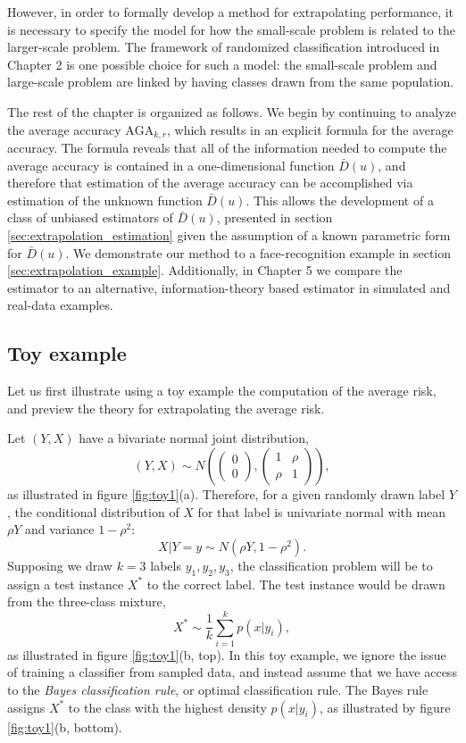 \documentclass[12pt]{article}
\begin{document}
However, in order to formally develop a method for extrapolating
performance, it is necessary to specify the model for how the
small-scale problem is related to the larger-scale problem.  The
framework of randomized classification introduced in Chapter 2 is one
possible choice for such a model: the small-scale problem and
large-scale problem are linked by having classes drawn from the same
population.

The rest of the chapter is organized as follows.  We begin by
continuing to analyze the average accuracy $\text{AGA}_{k, r}$, which
results in an explicit formula for the average accuracy.  The formula
reveals that all of the information needed to compute the average
accuracy is contained in a one-dimensional function $\bar{D}(u)$, and
therefore that estimation of the average accuracy can be accomplished
via estimation of the unknown function $\bar{D}(u)$.  This allows the
development of a class of unbiased estimators of $\bar{D}(u)$,
presented in section \ref{sec:extrapolation_estimation} given the
assumption of a known parametric form for $\bar{D}(u)$.  
We demonstrate our method to a face-recognition
example in section \ref{sec:extrapolation_example}.  Additionally, in
Chapter 5 %
we compare the estimator to an alternative, information-theory
based estimator in simulated and real-data examples.


\subsection{Toy example}

Let us first illustrate using a toy example the computation of the
average risk, and preview the theory for extrapolating the average
risk.

Let $(Y, X)$ have a bivariate normal joint distribution,
\[
(Y, X) \sim N\left(\begin{pmatrix}0 \\0\end{pmatrix}, \begin{pmatrix}1 & \rho \\ \rho & 1\end{pmatrix}\right),
\]
as illustrated in figure \ref{fig:toy1}(a).
Therefore, for a given randomly drawn label $Y$, the conditional
distribution of $X$ for that label is univariate normal with mean $\rho Y$ and variance $1-\rho^2$:
\[
X|Y = y \sim N(\rho Y, 1-\rho^2).
\]
Supposing we draw $k = 3$ labels $y_1,y_2, y_3$, the classification
problem will be to assign a test instance $X^*$ to the correct label.
The test instance would be drawn from the three-class mixture,
\[
X^* \sim \frac{1}{k}\sum_{i=1}^k p(x|y_i),
\]
as illustrated in figure \ref{fig:toy1}(b, top).  In this toy example, we
ignore the issue of training a classifier from sampled data, and
instead assume that we have access to the \emph{Bayes classification
rule}, or optimal classification rule.  The Bayes rule assigns $X^*$
to the class with the highest density $p(x|y_i)$, as illustrated by
figure \ref{fig:toy1}(b, bottom).
\end{document}
